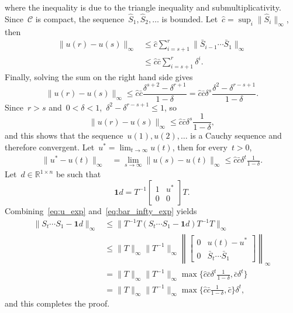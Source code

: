 \documentclass[letterpaper, 10 pt, conference]{ieeeconf}  %
\newcommand{\R}{\mathbb R}
\begin{document}
    where the inequality is due to the triangle inequality and submultiplicativity. Since~$\mathcal{C}$ is compact, the sequence~$\hat S_1, \hat S_2, \dots$ is bounded. Let~$\hat c = \sup_i \|\hat S_i\|_\infty$, then
    \begin{align*}
        \|u(r) - u(s)\|_\infty &\le  \hat c \sum_{i=s+1}^r \|\bar S_{i-1} \cdots \bar S_1 \|_\infty \\
        &\le \hat c \bar c \sum_{i=s+1}^r \delta^i.
    \end{align*}
    Finally, solving the sum on the right hand side gives
    \begin{equation}
        \|u(r) - u(s)\|_\infty \le \hat c \bar c \frac{\delta^{s+2} - \delta^{r+1}}{1-\delta} = \hat c \bar c \delta^s\frac{\delta^2 - \delta^{r-s+1}}{1-\delta}.
    \end{equation}
    Since~$r > s$ and~$0 < \delta < 1$,~$\delta^2 - \delta^{r-s+1} \le 1$, so
    \begin{equation}
        \|u(r) - u(s)\|_\infty \le \hat c \bar c\delta^s\frac{1}{1-\delta},
    \end{equation}
    and this shows that the sequence~$u(1),u(2),\dots$ is a Cauchy sequence and therefore convergent. Let~$u^* = \lim_{t \to \infty} u(t)$, then for every~$t > 0$,
    \begin{align}\label{eq:u_exp}
        \|u^* - u(t)\|_\infty &= \lim_{s \to \infty}\|u(s) - u(t)\|_\infty 
            \le \hat c \bar c \delta^{t} \frac{1}{1-\delta}.
    \end{align}
    Let~$d \in \R^{1 \times n}$ be such that
    \begin{equation}
        \mathbf{1}d = T^{-1}\begin{bmatrix}
            1 & u^* \\
            0 & 0
        \end{bmatrix}T.
    \end{equation}
    Combining~\eqref{eq:u_exp} and~\eqref{eq:bar_infty_exp} yields
    \begin{align*}
        \|S_t \cdots S_1 - \mathbf{1}d\|_\infty &\le \|T^{-1}T(S_t \cdots S_1 - \mathbf{1}d)T^{-1}T\|_\infty \\
        &\le \|T\|_\infty\|T^{-1}\|_\infty \left\| \begin{bmatrix}
            0 & u(t) - u^* \\ 0 & \bar S_t \cdots \bar S_1
        \end{bmatrix} \right\|_\infty \\
        &= \|T\|_\infty\|T^{-1}\|_\infty \max\{ \hat c \bar c \delta^t \frac{1}{1-\delta}, \bar c \delta^t \} \\
        &= \|T\|_\infty\|T^{-1}\|_\infty \max\{ \hat c \bar c \frac{1}{1-\delta}, \bar c \}  \delta^t,
    \end{align*}
    and this completes the proof.
    \hspace*{\fill}~\QED










\end{document}

